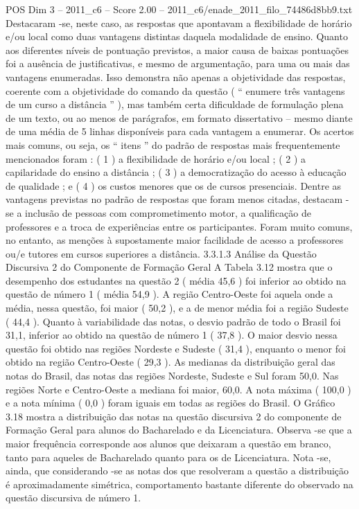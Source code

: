 \begin{textsample}{POS Dim 3 – 2011\_c6 – Score 2.00 – 2011\_c6/enade\_2011\_filo\_74486d8bb9.txt}
Destacaram -se, neste caso, as respostas que apontavam a flexibilidade de horário e/ou local como duas vantagens distintas daquela modalidade de ensino.
Quanto aos diferentes níveis de pontuação previstos, a maior causa de baixas pontuações foi a ausência de justificativas, e mesmo de argumentação, para uma ou mais das vantagens enumeradas.
Isso demonstra não apenas a objetividade das respostas, coerente com a objetividade do comando da questão ( “ enumere três vantagens de um curso a distância ” ), mas também certa dificuldade de formulação plena de um texto, ou ao menos de parágrafos, em formato dissertativo – mesmo diante de uma média de 5 linhas disponíveis para cada vantagem a enumerar.
Os acertos mais comuns, ou seja, os “ itens ” do padrão de respostas mais frequentemente mencionados foram : ( 1 ) a flexibilidade de horário e/ou local ; ( 2 ) a capilaridade do ensino a distância ; ( 3 ) a democratização do acesso à educação de qualidade ; e ( 4 ) os custos menores que os de cursos presenciais.
Dentre as vantagens previstas no padrão de respostas que foram menos citadas, destacam -se a inclusão de pessoas com comprometimento motor, a qualificação de professores e a troca de experiências entre os participantes.
Foram muito comuns, no entanto, as menções à supostamente maior facilidade de acesso a professores ou/e tutores em cursos superiores a distância. 3.3.1.3 Análise da Questão Discursiva 2 do Componente de Formação Geral A Tabela 3.12 mostra que o desempenho dos estudantes na questão 2 ( média 45,6 ) foi inferior ao obtido na questão de número 1 ( média 54,9 ).
A região Centro-Oeste foi aquela onde a média, nessa questão, foi maior ( 50,2 ), e a de menor média foi a região Sudeste ( 44,4 ).
Quanto à variabilidade das notas, o desvio padrão de todo o Brasil foi 31,1, inferior ao obtido na questão de número 1 ( 37,8 ).
O maior desvio nessa questão foi obtido nas regiões Nordeste e Sudeste ( 31,4 ), enquanto o menor foi obtido na região Centro-Oeste ( 29,3 ).
As medianas da distribuição geral das notas do Brasil, das notas das regiões Nordeste, Sudeste e Sul foram 50,0.
Nas regiões Norte e Centro-Oeste a mediana foi maior, 60,0.
A nota máxima ( 100,0 ) e a nota mínima ( 0,0 ) foram iguais em todas as regiões do Brasil.
O Gráfico 3.18 mostra a distribuição das notas na questão discursiva 2 do componente de Formação Geral para alunos do Bacharelado e da Licenciatura.
Observa -se que a maior frequência corresponde aos alunos que deixaram a questão em branco, tanto para aqueles de Bacharelado quanto para os de Licenciatura.
Nota -se, ainda, que considerando -se as notas dos que resolveram a questão a distribuição é aproximadamente simétrica, comportamento bastante diferente do observado na questão discursiva de número 1.

\end{textsample}

